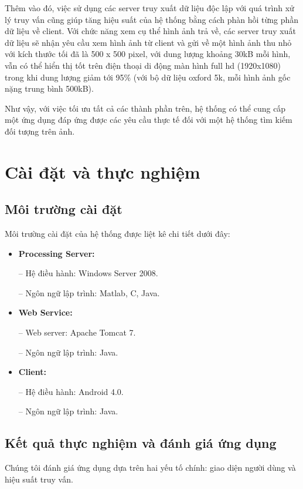 \begin{itemize}
Thêm vào đó, việc sử dụng các server truy xuất dữ liệu độc lập với quá trình xử lý truy vấn cũng giúp tăng hiệu suất của hệ thống bằng cách phàn hồi từng phần dữ liệu về client. Với chức năng xem cụ thể hình ảnh trả về, các server truy xuất dữ liệu sẽ nhận yêu cầu xem hình ảnh từ client và gửi về một hình ảnh thu nhỏ với kích thước tối đã là 500 x 500 pixel, với dung lượng khoảng 30kB mỗi hình, vẫn có thể hiển thị tốt trên điện thoại di động màn hình full hd (1920x1080) trong khi dung lượng giảm tới 95\% (với bộ dữ liệu oxford 5k, mỗi hình ảnh gốc nặng trung bình 500kB).

\end{itemize}

Như vậy, với việc tối ưu tất cả các thành phần trên, hệ thống có thể cung cấp một ứng dụng đáp ứng được các yêu cầu thực tế đối với một hệ thống tìm kiếm đối tượng trên ảnh.

\section{Cài đặt và thực nghiệm}
\label{c5-caidat}
	\subsection{Môi trường cài đặt}
	Môi trường cài đặt của hệ thống được liệt kê chi tiết dưới đây:
	
	\begin{itemize}
	\item \textbf{Processing Server:}
	
	-- Hệ điều hành: Windows Server 2008.
	
	-- Ngôn ngữ lập trình: Matlab, C, Java.
	
	\item \textbf{Web Service:}
	
	-- Web server: Apache Tomcat 7.
	
	-- Ngôn ngữ lập trình: Java.
	
	\item \textbf{Client:}
	
	-- Hệ điều hành: Android 4.0.
	
	-- Ngôn ngữ lập trình: Java. 
	\end{itemize}	
	
	\subsection{Kết quả thực nghiệm và đánh giá ứng dụng}
	Chúng tôi đánh giá ứng dụng dựa trên hai yếu tố chính: giao diện người dùng và hiệu suất truy vấn.
	

